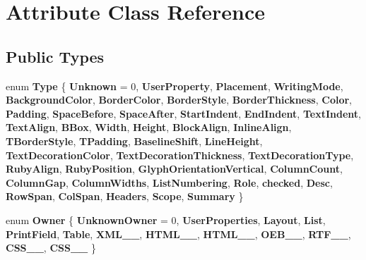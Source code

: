 \hypertarget{class_attribute}{}\section{Attribute Class Reference}
\label{class_attribute}
\subsection*{Public Types}
\begin{DoxyCompactItemize}
\item 
\mbox{\label{class_attribute_a3ed4590fb339b17856c8c2840eb9ca40}} 
enum {\bfseries Type} \{ \newline
{\bfseries Unknown} = 0, 
{\bfseries User\+Property}, 
{\bfseries Placement}, 
{\bfseries Writing\+Mode}, 
\newline
{\bfseries Background\+Color}, 
{\bfseries Border\+Color}, 
{\bfseries Border\+Style}, 
{\bfseries Border\+Thickness}, 
\newline
{\bfseries Color}, 
{\bfseries Padding}, 
{\bfseries Space\+Before}, 
{\bfseries Space\+After}, 
\newline
{\bfseries Start\+Indent}, 
{\bfseries End\+Indent}, 
{\bfseries Text\+Indent}, 
{\bfseries Text\+Align}, 
\newline
{\bfseries B\+Box}, 
{\bfseries Width}, 
{\bfseries Height}, 
{\bfseries Block\+Align}, 
\newline
{\bfseries Inline\+Align}, 
{\bfseries T\+Border\+Style}, 
{\bfseries T\+Padding}, 
{\bfseries Baseline\+Shift}, 
\newline
{\bfseries Line\+Height}, 
{\bfseries Text\+Decoration\+Color}, 
{\bfseries Text\+Decoration\+Thickness}, 
{\bfseries Text\+Decoration\+Type}, 
\newline
{\bfseries Ruby\+Align}, 
{\bfseries Ruby\+Position}, 
{\bfseries Glyph\+Orientation\+Vertical}, 
{\bfseries Column\+Count}, 
\newline
{\bfseries Column\+Gap}, 
{\bfseries Column\+Widths}, 
{\bfseries List\+Numbering}, 
{\bfseries Role}, 
\newline
{\bfseries checked}, 
{\bfseries Desc}, 
{\bfseries Row\+Span}, 
{\bfseries Col\+Span}, 
\newline
{\bfseries Headers}, 
{\bfseries Scope}, 
{\bfseries Summary}
 \}
\item 
\mbox{\label{class_attribute_a2b66c48259e09402566fd0b096e8afc0}} 
enum {\bfseries Owner} \{ \newline
{\bfseries Unknown\+Owner} = 0, 
{\bfseries User\+Properties}, 
{\bfseries Layout}, 
{\bfseries List}, 
\newline
{\bfseries Print\+Field}, 
{\bfseries Table}, 
{\bfseries X\+M\+L\+\_\+\_}, 
{\bfseries H\+T\+M\+L\+\_\+\_}, 
\newline
{\bfseries H\+T\+M\+L\+\_\+\_}, 
{\bfseries O\+E\+B\+\_\+\_}, 
{\bfseries R\+T\+F\+\_\+\_}, 
{\bfseries C\+S\+S\+\_\+\_}, 
\newline
{\bfseries C\+S\+S\+\_\+\_}
 \}
\end{DoxyCompactItemize}
